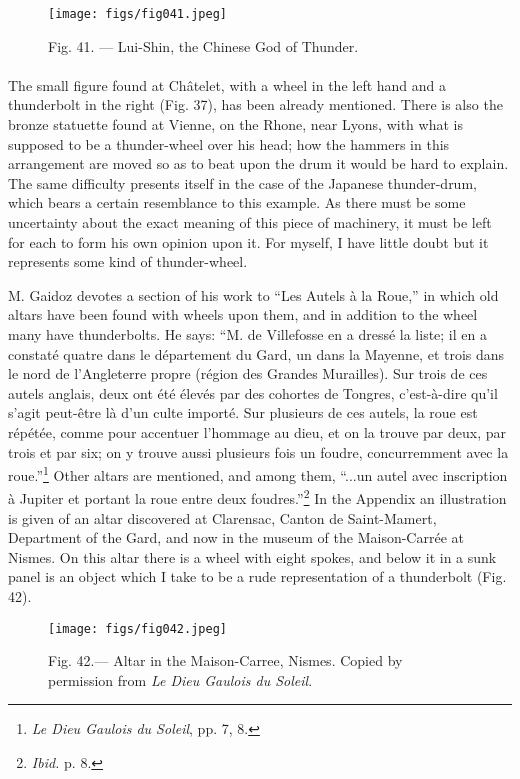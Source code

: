 \documentclass[a4paper, 11pt, oneside, polutonikogreek, english]{article}
\begin{document}
\begin{figure}[H]
\centering
\texttt{[image: figs/fig041.jpeg]}
\caption{Fig. 41. --- Lui-Shin, the Chinese God of Thunder.}
\end{figure}
\paragraph{}
The small figure found at Châtelet, with a wheel in the left hand and a thunderbolt in the right (Fig. 37), has been already mentioned. There is also the bronze statuette found at Vienne, on the Rhone, near Lyons, with what is supposed to be a thunder-wheel over his head; how the hammers in this arrangement are moved so as to beat upon the drum it would be hard to explain. The same difficulty presents itself in the case of the Japanese thunder-drum, which bears a certain resemblance to this example. As there must be some uncertainty about the exact meaning of this piece of machinery, it must be left for each to form his own opinion upon it. For myself, I have little doubt but it represents some kind of thunder-wheel.

M. Gaidoz devotes a section of his work to ``Les Autels à la Roue,'' in which old altars have been found with wheels upon them, and in addition to the wheel many have thunderbolts. He says: ``M. de Villefosse en a dressé la liste; il en a constaté quatre dans le département du Gard, un dans la Mayenne, et trois dans le nord de l'Angleterre propre (région des Grandes Murailles). Sur trois de ces autels anglais, deux ont été élevés par des cohortes de Tongres, c'est-à-dire qu'il s'agit peut-être là d'un culte importé. Sur plusieurs de ces autels, la roue est répétée, comme pour accentuer l'hommage au dieu, et on la trouve par deux, par trois et par six; on y trouve aussi plusieurs fois un foudre, concurremment avec la roue.''\footnote{\emph{Le Dieu Gaulois du Soleil}, pp. 7, 8.} Other altars are mentioned, and among them, ``...un autel avec inscription à Jupiter et portant la roue entre deux foudres.''\footnote{\emph{Ibid.} p. 8.} In the Appendix an illustration is given of an altar discovered at Clarensac, Canton de Saint-Mamert, Department of the Gard, and now in the museum of the Maison-Carrée at Nismes. On this altar there is a wheel with eight spokes, and below it in a sunk panel is an object which I take to be a rude representation of a thunderbolt (Fig. 42).

\begin{figure}[H]
\centering
\texttt{[image: figs/fig042.jpeg]}
\caption[Fig. 42.--- Altar in the Maison-Carree, Nismes.]{Fig. 42.--- Altar in the Maison-Carree, Nismes. Copied by permission from \emph{Le Dieu Gaulois du Soleil}.}
\end{figure}
\end{document}
